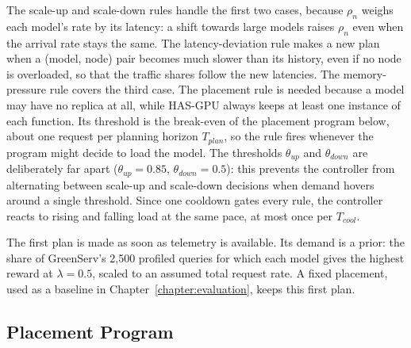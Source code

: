 The scale-up and scale-down rules handle the first two cases, because $\rho_n$ weighs each model's rate by its latency: a shift towards large models raises $\rho_n$ even when the arrival rate stays the same.
The latency-deviation rule makes a new plan when a (model, node) pair becomes much slower than its history, even if no node is overloaded, so that the traffic shares follow the new latencies.
The memory-pressure rule covers the third case.
The placement rule is needed because a model may have no replica at all, while HAS-GPU always keeps at least one instance of each function.
Its threshold is the break-even of the placement program below, about one request per planning horizon $T_{plan}$, so the rule fires whenever the program might decide to load the model.
The thresholds $\theta_{up}$ and $\theta_{down}$ are deliberately far apart ($\theta_{up} = 0.85$, $\theta_{down} = 0.5$): this prevents the controller from alternating between scale-up and scale-down decisions when demand hovers around a single threshold.
Since one cooldown gates every rule, the controller reacts to rising and falling load at the same pace, at most once per $T_{cool}$.

The first plan is made as soon as telemetry is available.
Its demand is a prior: the share of GreenServ's 2,500 profiled queries \cite{greenserv_code} for which each model gives the highest reward at $\lambda = 0.5$, scaled to an assumed total request rate.
A fixed placement, used as a baseline in Chapter~\ref{chapter:evaluation}, keeps this first plan.

\subsection{Placement Program}
\label{sec:placement-program}

